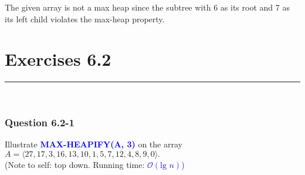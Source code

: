\documentclass[11pt]{article}
\begin{document}
\indent The given array is not a max heap since the subtree with 6 as its root and 7 as its left child violates the max-heap property.\\

\newpage

\section*{Exercises 6.2}\nointerlineskip
\noindent \rule{\linewidth}{0.01pt}\\

\subsubsection*{Question 6.2-1}\nointerlineskip
Illustrate \textcolor{blue}{\textbf{MAX-HEAPIFY(A, 3)}} on the array $A = \langle 27, 17, 3, 16, 13, 10, 1, 5, 7, 12, 4, 8, 9, 0 \rangle. $\\
(Note to self: top down. Running time: \textcolor{blue}{$\mathcal{O}(\text{lg } n)$)}\\

\newcommand{\hindex}[1]{\textcolor{red}{\small${#1}$}}
\end{document}
